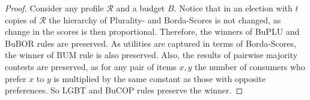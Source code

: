 \documentclass{article}
\begin{document}
\begin{proof}\renewcommand{\qedsymbol}{}

Consider any profile $\mathcal{R}$ and a budget $B$. Notice that in an election with $t$ copies of $\mathcal{R}$ the hierarchy of Plurality- and Borda-Scores is not changed, as change in the scores is then proportional. Therefore, the winners of BuPLU and BuBOR rules are preserved. As utilities are captured in terms of Borda-Scores, the winner of BUM rule is also preserved. Also, the results of pairwise majority contests are preserved, as for any pair of items $x, y$  the number of consumers who prefer $x$ to $y$ is multiplied by the same constant as those with opposite preferences. So LGBT and BuCOP rules preserve the winner.
\end{proof}
\end{document}
